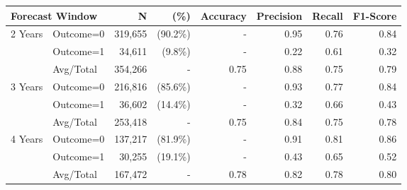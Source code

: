 \begin{tabular}{llrrrrrr} \toprule
\multicolumn{2}{l}{Forecast Window} & N & (\%)    & Accuracy & Precision   & Recall & F1-Score \\ \midrule
2 Years & Outcome=0 & 319,655 & (90.2\%) & - & 0.95 & 0.76 & 0.84 \\
        & Outcome=1 & 34,611 & (9.8\%) & - & 0.22 & 0.61 & 0.32 \\
        & Avg/Total & 354,266 & - & 0.75 & 0.88 & 0.75 & 0.79 \\
3 Years & Outcome=0 & 216,816 & (85.6\%) & - & 0.93 & 0.77 & 0.84 \\
        & Outcome=1 & 36,602 & (14.4\%) & - & 0.32 & 0.66 & 0.43 \\
        & Avg/Total & 253,418 & - & 0.75 & 0.84 & 0.75 & 0.78 \\
4 Years & Outcome=0 & 137,217 & (81.9\%) & - & 0.91 & 0.81 & 0.86 \\
        & Outcome=1 & 30,255 & (19.1\%) & - & 0.43 & 0.65 & 0.52 \\
        & Avg/Total & 167,472 & - & 0.78 & 0.82 & 0.78 & 0.80 \\
\bottomrule \end{tabular}
